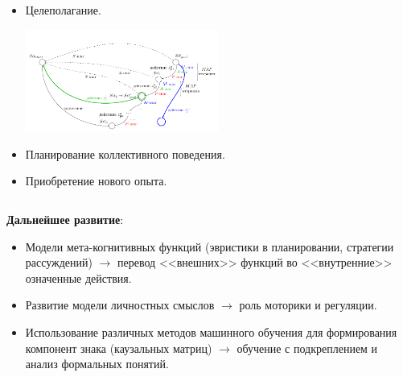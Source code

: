 \documentclass[default]{beamer}
\begin{document}
\begin{frame}
\begin{columns}
\begin{column}{0.4\textwidth}
\begin{itemize}
\begin{center}
					\end{center}
					\item Целеполагание.
					\begin{center}
						\includegraphics[width=0.5\textwidth]{algo/ru/gmap_ru}
					\end{center}
					\item Планирование коллективного поведения.
					\item Приобретение нового опыта.
				\end{itemize}
			\end{column}
		\end{columns}
		\textbf{Дальнейшее развитие}:
		\begin{itemize}
			\item Модели мета-когнитивных функций (эвристики в планировании, стратегии рассуждений) $\rightarrow$ перевод <<внешних>> функций во <<внутренние>> означенные действия.
			\item Развитие модели личностных смыслов $\rightarrow$ роль моторики и регуляции.
			\item Использование различных методов машинного обучения для формирования компонент знака (каузальных матриц) $\rightarrow$ обучение с подкреплением и анализ формальных понятий.
		\end{itemize}
	\end{frame}
		

%		
%				
	
\end{document}
